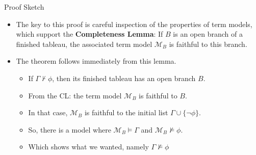 \begin{frame}{Proof Sketch}

	\begin{itemize}%
	\itemsep=16pt
		
	\item The key to this proof is careful inspection of the properties of term models, which support the \textbf{Completeness Lemma}: If $B$ is an open branch of a finished tableau, the associated term model $\mathcal{M}_B$ is faithful to this branch.

	\item The theorem follows immediately from this lemma.
		\begin{itemize}%
		\item If $\Gamma\nvdash\phi$, then its finished tableau has an open branch $B$.
		\item From the CL: the term model $\mathcal{M}_B$ is faithful to $B$.
		\item In that case, $\mathcal{M}_B$ is faithful to the initial list $\Gamma\cup\{\neg\phi\}$.
		\item So, there is a model where $\mathcal{M}_B\vDash\Gamma$ and $\mathcal{M}_B\nvDash\phi$.
		\item Which shows what we wanted, namely $\Gamma\nvDash\phi$
		\end{itemize}
                  
	\end{itemize}

\end{frame}
		
